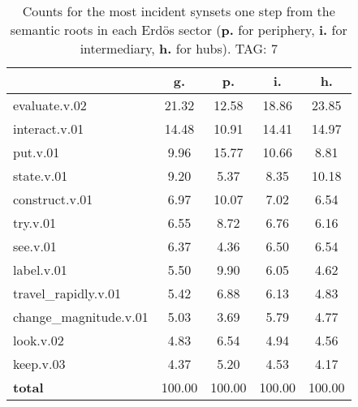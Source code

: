\begin{table}[h!]
\begin{center}
\begin{tabular}{| l || c | c | c | c |}\hline
 & {\bf g.} & {\bf p.} & {\bf i.} & {\bf h.} \\\hline\hline
evaluate.v.02 & 21.32  & 12.58  & 18.86  & 23.85 \\\hline
interact.v.01 & 14.48  & 10.91  & 14.41  & 14.97 \\\hline
put.v.01 & 9.96  & 15.77  & 10.66  & 8.81 \\\hline
state.v.01 & 9.20  & 5.37  & 8.35  & 10.18 \\\hline
construct.v.01 & 6.97  & 10.07  & 7.02  & 6.54 \\\hline
try.v.01 & 6.55  & 8.72  & 6.76  & 6.16 \\\hline
see.v.01 & 6.37  & 4.36  & 6.50  & 6.54 \\\hline
label.v.01 & 5.50  & 9.90  & 6.05  & 4.62 \\\hline
travel\_rapidly.v.01 & 5.42  & 6.88  & 6.13  & 4.83 \\\hline
change\_magnitude.v.01 & 5.03  & 3.69  & 5.79  & 4.77 \\\hline
look.v.02 & 4.83  & 6.54  & 4.94  & 4.56 \\\hline
keep.v.03 & 4.37  & 5.20  & 4.53  & 4.17 \\\hline\hline
{{\bf total}} & 100.00  & 100.00  & 100.00  & 100.00 \\\hline
\end{tabular}
\caption{Counts for the most incident synsets one step from the semantic roots in each Erd\"os sector ({\bf p.} for periphery, {\bf i.} for intermediary, {\bf h.} for hubs). TAG: 7}
\end{center}
\end{table}